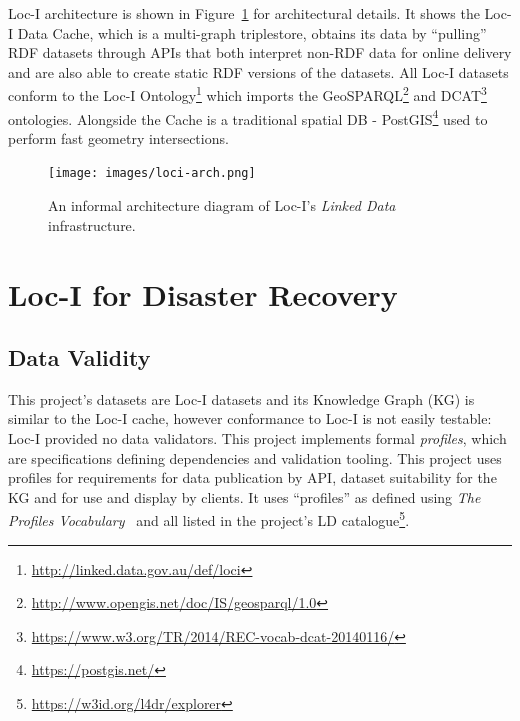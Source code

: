 \documentclass[runningheads]{llncs}
\begin{document}
Loc-I architecture is shown in Figure~\ref{fig:loci-arch} for architectural details. It shows the Loc-I Data Cache, which is a multi-graph triplestore, 
obtains its data by ``pulling'' RDF datasets through APIs that both interpret non-RDF data for online delivery and are also able to create static RDF 
versions of the datasets. All Loc-I datasets conform to the Loc-I Ontology\footnote{\url{http://linked.data.gov.au/def/loci}} which imports the GeoSPARQL\footnote{\url{http://www.opengis.net/doc/IS/geosparql/1.0}} and DCAT\footnote{\url{https://www.w3.org/TR/2014/REC-vocab-dcat-20140116/}} ontologies. 
Alongside the Cache is a traditional spatial DB - PostGIS\footnote{\url{https://postgis.net/}} used to perform fast geometry intersections.

\begin{figure}[htb]
    \centering
    \texttt{[image: images/loci-arch.png]}
    \caption{An informal architecture diagram of Loc-I's \textit{Linked Data} infrastructure.}
    \label{fig:loci-arch}
\end{figure}

\section{Loc-I for Disaster Recovery}\label{sec:changes}
\subsection{Data Validity}
This project's datasets are Loc-I datasets and its Knowledge Graph (KG) is similar to the Loc-I cache, however conformance to Loc-I is not easily
testable: Loc-I provided no data validators. This project implements formal \textit{profiles}, which 
are specifications defining dependencies and validation tooling. This project uses profiles for requirements for data 
publication by API, dataset suitability for the KG and for use and display by clients. It uses ``profiles'' as defined using 
\textit{The Profiles Vocabulary}~\cite{atkinson_profiles_2020} and all listed in the project's LD catalogue\footnote{\label{catalogue}\url{https://w3id.org/l4dr/explorer}}.
\end{document}

